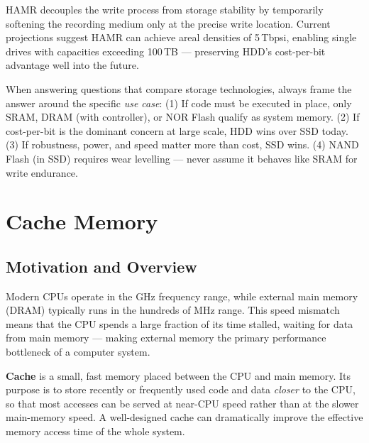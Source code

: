 \documentclass[11pt, a4paper, notitlepage]{report}
\theoremstyle{definition}
\theoremstyle{remark}
\theoremstyle{definition}
\begin{document}
\begin{keyresult}[title={Key Result: HAMR Enables Higher Areal Density}]
  HAMR decouples the write process from storage stability by temporarily softening the recording medium only at the precise write location. Current projections suggest HAMR can achieve areal densities of 5\,Tbpsi, enabling single drives with capacities exceeding 100\,TB — preserving HDD's cost-per-bit advantage well into the future.
\end{keyresult}

\begin{examtip}[title={Exam Tip: Connecting Memory Topics}]
  When answering questions that compare storage technologies, always frame the answer around the specific \emph{use case}: (1) If code must be executed in place, only SRAM, DRAM (with controller), or NOR Flash qualify as system memory. (2) If cost-per-bit is the dominant concern at large scale, HDD wins over SSD today. (3) If robustness, power, and speed matter more than cost, SSD wins. (4) NAND Flash (in SSD) requires wear levelling — never assume it behaves like SRAM for write endurance.
\end{examtip}

\chapter{Cache Memory}
\label{chap:cache}

\section{Motivation and Overview}
\label{sec:cache-motivation}

Modern CPUs operate in the GHz frequency range, while external main memory (DRAM) typically runs in the hundreds of MHz range. This speed mismatch means that the CPU spends a large fraction of its time stalled, waiting for data from main memory — making external memory the primary performance bottleneck of a computer system.

\textbf{Cache} is a small, fast memory placed between the CPU and main memory. Its purpose is to store recently or frequently used code and data \emph{closer} to the CPU, so that most accesses can be served at near-CPU speed rather than at the slower main-memory speed. A well-designed cache can dramatically improve the effective memory access time of the whole system.
\end{document}

